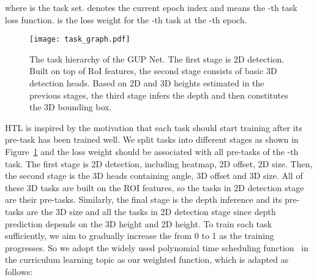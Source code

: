 \documentclass[10pt,twocolumn,letterpaper]{article}
\begin{document}
where  is the task set.  denotes the current epoch index and  means the -th task loss function.  is the loss weight for the -th task at the -th epoch.

\begin{figure}[t]
\begin{center}
\texttt{[image: task\_graph.pdf]}
\end{center}
   \caption{The task hierarchy of the GUP Net. The first stage is
2D detection. Built on top of RoI features, the second stage
consists of basic 3D detection heads. Based on 2D and 3D heights
estimated in the previous stages, the third stage infers the depth and
then constitutes the 3D bounding box.}
\label{fig:task_graph}
\end{figure}

HTL is inspired by the motivation that each task should start training after its pre-task has been trained well. We split tasks into different stages as shown in Figure~\ref{fig:task_graph} and the loss weight  should be associated with all pre-tasks of the -th task. The first stage is 2D detection, including heatmap, 2D offset, 2D size. Then, the second stage is the 3D heads containing angle, 3D offset and 3D size. All of these 3D tasks are built on the ROI features, so the tasks in 2D detection stage are their pre-tasks. Similarly, the final stage is the depth inference and its pre-tasks are the 3D size and all the tasks in 2D detection stage since depth prediction depends on the 3D height and 2D height.
To train each task sufficiently, we aim to gradually increase the  from 0 to 1 as the training progresses. So we adopt the widely used polynomial time scheduling function~\cite{morerio2017curriculum} in the curriculum learning topic as our weighted function, which is adapted as follows:
\end{document}
